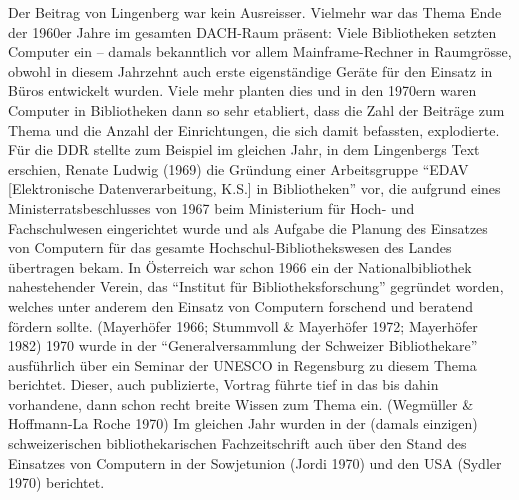 \documentclass[a4paper,
fontsize=11pt,
oneside,
numbers=noperiodatend,
parskip=half-,
bibliography=totoc,
final
]{scrartcl}
\begin{document}
Der Beitrag von Lingenberg war kein Ausreisser. Vielmehr war das Thema
Ende der 1960er Jahre im gesamten DACH-Raum präsent: Viele Bibliotheken
setzten Computer ein -- damals bekanntlich vor allem Mainframe-Rechner
in Raumgrösse, obwohl in diesem Jahrzehnt auch erste eigenständige
Geräte für den Einsatz in Büros entwickelt wurden. Viele mehr planten
dies und in den 1970ern waren Computer in Bibliotheken dann so sehr
etabliert, dass die Zahl der Beiträge zum Thema und die Anzahl der
Einrichtungen, die sich damit befassten, explodierte. Für die DDR
stellte zum Beispiel im gleichen Jahr, in dem Lingenbergs Text erschien,
Renate Ludwig (1969) die Gründung einer Arbeitsgruppe \enquote{EDAV
{[}Elektronische Datenverarbeitung, K.S.{]} in Bibliotheken} vor, die
aufgrund eines Ministerratsbeschlusses von 1967 beim Ministerium für
Hoch- und Fachschulwesen eingerichtet wurde und als Aufgabe die Planung
des Einsatzes von Computern für das gesamte Hochschul-Bibliothekswesen
des Landes übertragen bekam. In Österreich war schon 1966 ein der
Nationalbibliothek nahestehender Verein, das \enquote{Institut für
Bibliotheksforschung} gegründet worden, welches unter anderem den
Einsatz von Computern forschend und beratend fördern sollte. (Mayerhöfer
1966; Stummvoll \& Mayerhöfer 1972; Mayerhöfer 1982) 1970 wurde in der
\enquote{Generalversammlung der Schweizer Bibliothekare} ausführlich über ein
Seminar der UNESCO in Regensburg zu diesem Thema berichtet. Dieser, auch
publizierte, Vortrag führte tief in das bis dahin vorhandene, dann schon
recht breite Wissen zum Thema ein. (Wegmüller \& Hoffmann-La Roche 1970)
Im gleichen Jahr wurden in der (damals einzigen) schweizerischen
bibliothekarischen Fachzeitschrift auch über den Stand des Einsatzes von
Computern in der Sowjetunion (Jordi 1970) und den USA (Sydler 1970)
berichtet.
\end{document}
